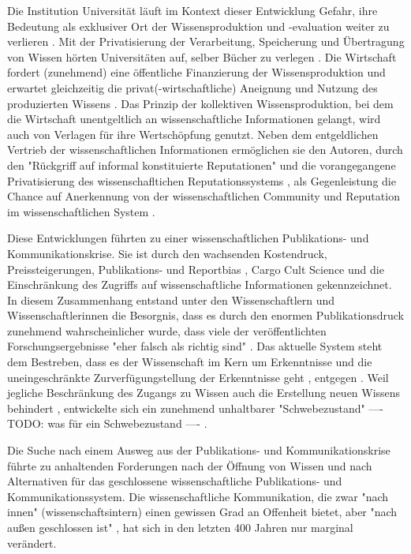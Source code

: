 Die Institution Universität läuft im Kontext dieser Entwicklung Gefahr, ihre Bedeutung als exklusiver Ort der Wissensproduktion und -evaluation weiter zu verlieren \cite{suchen}. Mit der Privatisierung der Verarbeitung, Speicherung und Übertragung von Wissen hörten Universitäten auf, selber Bücher zu verlegen \cite{cite:0}. Die Wirtschaft fordert (zunehmend) eine öffentliche Finanzierung der Wissensproduktion und erwartet gleichzeitig die privat(-wirtschaftliche) Aneignung und Nutzung des produzierten Wissens \cite{cite:2}. Das Prinzip der kollektiven Wissensproduktion, bei dem die Wirtschaft unentgeltlich an wissenschaftliche Informationen gelangt, wird auch von Verlagen für ihre Wertschöpfung genutzt. Neben dem entgeldlichen Vertrieb der wissenschaftlichen Informationen ermöglichen sie den Autoren, durch den "Rückgriff auf informal konstituierte Reputationen" \cite{luhmann_1970_selbststeuerung} und die vorangegangene Privatisierung des wissenschafltichen Reputationssystems \cite{suchen}, als Gegenleistung die Chance auf Anerkennung von der wissenschaftlichen Community und Reputation im wissenschaftlichen System \cite{cite:21a}.

Diese Entwicklungen führten zu einer wissenschaftlichen Publikations- und Kommunikationskrise. Sie ist durch den wachsenden Kostendruck, Preissteigerungen, Publikations- \cite{Egger_1997} \cite{Fanelli_2012} \cite{Beverungen_2012} und Reportbias \cite{Chan_2008} \cite{Dickersin_2011}, Cargo Cult Science \cite{Feynman_1974} und die Einschränkung des Zugriffs auf wissenschaftliche Informationen \cite{Hess_2006} gekennzeichnet. In diesem Zusammenhang entstand unter den Wissenschaftlern und Wissenschaftlerinnen die Besorgnis, dass es durch den enormen Publikationsdruck zunehmend wahrscheinlicher wurde, dass viele der veröffentlichten Forschungsergebnisse "eher falsch als richtig sind" \cite{Ioannidis_2005}. Das aktuelle System steht dem Bestreben, dass es der Wissenschaft im Kern um Erkenntnisse und die uneingeschränkte Zurverfügungstellung der Erkenntnisse geht \cite{hanekop_2006}, entgegen \cite{offhaus_2012_institutionelle_repos}. Weil jegliche Beschränkung des Zugangs zu Wissen auch die Erstellung neuen Wissens behindert \cite{cite:5} \cite{cite:8} \cite{Luhmann1998}, entwickelte sich ein zunehmend unhaltbarer "Schwebezustand" ---- TODO: was für ein Schwebezustand ---- \cite{suchen}.

Die Suche nach einem Ausweg aus der Publikations- und Kommunikationskrise führte zu anhaltenden Forderungen nach der Öffnung von Wissen und nach Alternativen für das geschlossene wissenschaftliche Publikations- und Kommunikationssystem. Die wissenschaftliche Kommunikation, die zwar "nach innen" (wissenschaftsintern) einen gewissen Grad an Offenheit bietet, aber "nach außen geschlossen ist" \cite{kelty_2004}, hat sich in den letzten 400 Jahren nur marginal verändert.

